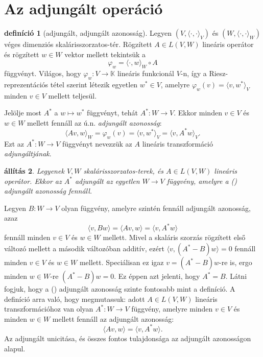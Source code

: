 \documentclass[a4paper, showtrims]{memoir}
\makeatletter
\renewenvironment{proof}[1][\proofname]
    {\par\pushQED{\qed}%
    \normalfont \topsep6\p@\@plus6\p@\relax
    \trivlist
    \item[\hskip\labelsep
        \itshape
    #1\@addpunct{:}]\ignorespaces}
    {\popQED\endtrivlist\@endpefalse}
\theoremstyle{plain}
\newtheorem{proposition}{állítás}[chapter]
\theoremstyle{remark}
\theoremstyle{definition}
\newtheorem{definition}[proposition]{definíció}
\newcommand{\ip}[2]{\langle#1,#2\rangle}
\makeatother
\begin{document}
\section{Az adjungált operáció}
\begin{definition}[adjungált, adjungált azonosság]
	Legyen $\left( V,\ip{\cdot}{\cdot}_V \right)$ és
	$\left( W,\ip{\cdot}{\cdot}_W \right)$ véges dimenziós ska\-láris\-szor\-zatos-tér.
	Rögzített $A\in L\left( V,W \right)$ lineáris operátor és rögzített $w\in W$ vektor mellett tekintsük a
	\[
		\varphi_w=
		\ip{\cdot}{w}_W\circ A
	\]
	függvényt.
	Világos, hogy $\varphi_w:V\to\mathbb{K}$ lineáris funkcionál $V$-n,
	így a Riesz-reprezentációs tétel szerint létezik egyetlen $w^\ast\in V$,
	amelyre
	$\varphi_w\left( v \right)=\ip{v}{w^\ast}_V$ minden $v\in V$ mellett teljesül.

	Jelölje most $A^\ast$ a $w\mapsto w^\ast$ függvényt, tehát
	$A^\ast:W\to V$.
	Ekkor minden $v\in V$ és $w\in W$ mellett fennáll az ú.n. \emph{adjungált azonosság}:
	\[
		\ip{Av}{w}_W
		=
		\varphi_w\left( v \right)
		=
		\ip{v}{w^\ast}_V
		=
		\ip{v}{A^\ast w}_V.\tag{\dag}
	\]
	Ezt az $A^\ast:W\to V$ függvényt nevezzük az $A$ lineáris transzformáció \emph{adjungáltjának}.
\end{definition}
\begin{proposition}
	Legyenek $V,W$ skalárisszorzatos-terek, és $A\in L\left( V,W \right)$ lineáris operátor.
	Ekkor az $A^\ast$ adjungált az egyetlen $W\to V$ függvény,
	amelyre a (\dag) adjungált azonosság fennáll.
\end{proposition}
\begin{proof}
	Legyen $B:W\to V$ olyan függvény, amelyre szintén fennáll adjungált azonosság,
	azaz
	\[
		\ip{v}{Bw}
		=
		\ip{Av}{w}
		=
		\ip{v}{A^\ast w}
	\]
	fennáll minden $v\in V$ és $w\in W$ mellett.
	Mivel a skaláris szorzás rögzített első változó mellett a második változóban additív,
	ezért
	$\ip{v}{\left( A^\ast-B \right)w}=0$ fennáll minden $v\in V$ és $w\in W$ mellett.
	Speciálisan ez igaz $v=\left( A^\ast-B \right)w$-re is, ergo minden $w\in W$-re
	$\left( A^\ast-B \right)w=0$.
	Ez éppen azt jelenti, hogy $A^\ast=B$.
\end{proof}
Látni fogjuk, hogy a (\dag) adjungált azonosság szinte fontosabb mint a definíció.
A definíció arra való, hogy megmutassuk: adott $A\in L\left( V,W \right)$ lineáris transzformációhoz van olyan
$A^\ast:W\to V$ függvény, amelyre minden $v\in V$ és minden $w\in W$ mellett fennáll az adjungált azonosság:
\[
	\ip{Av}{w}
	=
	\ip{v}{A^\ast w}.
	\tag{\dag}
\]
Az adjungált unicitása, és összes fontos tulajdonsága az adjungált azonosságon alapul.
\end{document}
